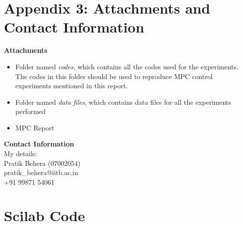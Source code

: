 \section{Appendix 3: Attachments and Contact Information}
\textbf{Attachments}
\begin{itemize}
\item Folder named \emph{codes}, which contains all the codes used for the experiments. The codes in this folder should be used to reproduce MPC control experiments mentioned in this report.
\item Folder named \emph{data files}, which contains data files for all the experiments performed
\item MPC Report
\end{itemize}
\textbf{Contact Information} \\
My details: \\
Pratik Behera (07002054) \\
pratik\_behera@iitb.ac.in \\
+91 99871 54061

\section{Scilab Code}\label{mpccode}
\begin{code}

\end{code}\

\begin{code}

\end{code}

\begin{code}

\end{code}

\begin{code}

\end{code}

